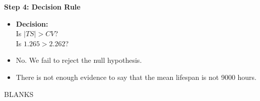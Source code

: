 \documentclass[a4paper,12pt]{article}
\begin{document}
\newpage
\noindent \textbf{Step 4: Decision Rule}
\smallskip
\begin{itemize}
\item \textbf{Decision:}\\ Is $|TS| >CV$? \\Is $1.265 > 2.262$?
\item No. We fail to reject the null hypothesis. \item There is not enough evidence to say that the mean lifespan is not 9000 hours.
\end{itemize}



\newpage
BLANKS
\end{document}
